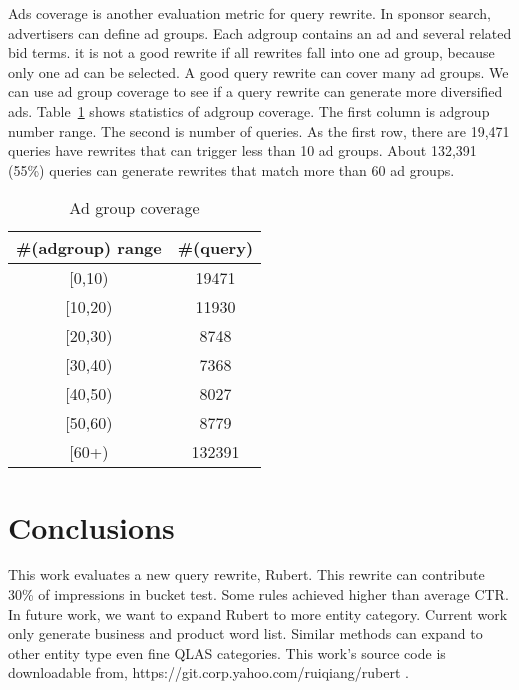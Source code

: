 \documentclass{sig-alternate}
\begin{document}
Ads coverage is another evaluation metric for query rewrite. In sponsor search,  advertisers can define ad groups. Each adgroup contains an ad and several related bid terms. it is not a good rewrite if all rewrites fall into one ad group,  because only one ad can be selected. A good query rewrite can cover many ad groups. We can use ad group coverage to see if a query rewrite can generate more diversified ads.  Table~\ref{table:coverage} shows statistics of adgroup coverage. The first column is adgroup number range. The second is number of queries. As the first row, there are 19,471 queries have rewrites that can trigger less than 10 ad groups.  About 132,391 (55\%) queries can generate rewrites that match more than 60 ad groups.
 
\begin{table}
\begin{center}    
\caption{Ad group coverage}
\begin{tabular}{|c|c|}  \hline 
\#(adgroup) range & \#(query) \\ \hline
[0,10)  & 19471 \\ \hline
[10,20) & 11930 \\ \hline
[20,30) & 8748 \\ \hline
[30,40) & 7368 \\ \hline
[40,50) & 8027 \\ \hline
[50,60) & 8779 \\ \hline
[60+)   & 132391 \\ \hline
\end{tabular}
\label{table:coverage}
\end{center}    

\end{table}






\section{Conclusions}
This work evaluates a new query rewrite, Rubert. This rewrite can contribute 30\% of impressions in bucket test. Some rules achieved higher than average CTR. In future work, we want to expand Rubert to more entity category. Current work only generate business and product word list. Similar methods can expand to other entity type even fine QLAS categories.   This work's source code is downloadable from, https://git.corp.yahoo.com/ruiqiang/rubert .




\end{document}
